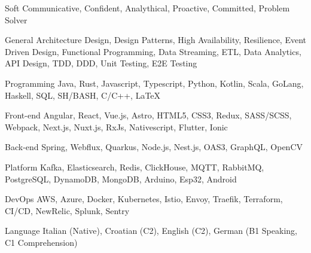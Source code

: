 
\begin{cvskills}

  \cvskill
    {Soft} %
    {Communicative, Confident, Analythical, Proactive, Committed, Problem Solver} %

  \cvskill
    {General} %
    {Architecture Design, Design Patterns, High Availability, Resilience, Event Driven Design, Functional Programming,\newline
    Data Streaming, ETL, Data Analytics, API Design, TDD, DDD, Unit Testing, E2E Testing} %

  \cvskill
    {Programming} %
    {Java, Rust, Javascript, Typescript, Python, Kotlin, Scala, GoLang, Haskell, SQL, SH/BASH, C/C++, LaTeX} %

  \cvskill
    {Front-end} %
    {Angular, React, Vue.js, Astro, HTML5, CSS3, Redux, SASS/SCSS, Webpack, Next.js, Nuxt.js, RxJs, Nativescript, Flutter, Ionic} %
    
  \cvskill
    {Back-end} %
    {Spring, Webflux, Quarkus, Node.js, Nest.js, OAS3, GraphQL, OpenCV} %

  \cvskill
    {Platform} %
    {Kafka, Elasticsearch, Redis, ClickHouse, MQTT, RabbitMQ, PostgreSQL, DynamoDB, MongoDB, Arduino, Esp32, Android} %

  \cvskill
    {DevOps} %
    {AWS, Azure, Docker, Kubernetes, Istio, Envoy, Traefik, Terraform, CI/CD, NewRelic, Splunk, Sentry} %

  \cvskill
    {Language} %
    {Italian (Native), Croatian (C2), English (C2), German (B1 Speaking, C1 Comprehension)} %

\end{cvskills}
